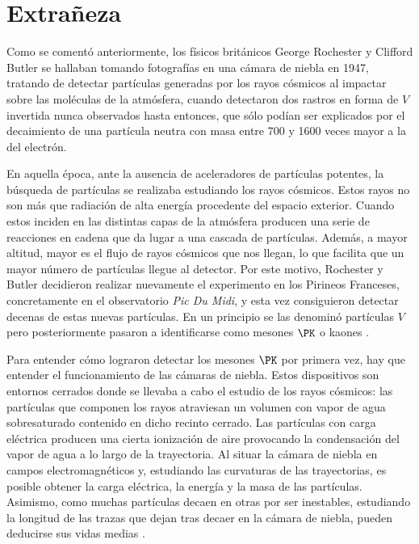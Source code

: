 \chapter{Extrañeza}\label{cap:strangeness}
Como se comentó anteriormente, los físicos británicos George Rochester y Clifford Butler se hallaban tomando fotografías en una cámara de niebla en 1947, tratando de detectar partículas generadas por los rayos cósmicos al impactar sobre las moléculas de la atmósfera, cuando detectaron dos rastros en forma de $V$ invertida nunca observados hasta entonces, que sólo podían ser explicados por el decaimiento de una partícula neutra con masa entre 700 y 1600 veces mayor a la del electrón. 

En aquella época, ante la ausencia de aceleradores de partículas potentes, la búsqueda de partículas se realizaba estudiando los rayos cósmicos. Estos rayos no son más que radiación de alta energía procedente del espacio exterior. Cuando estos inciden en las distintas capas de la atmósfera producen una serie de reacciones en cadena que da lugar a una cascada de partículas. Además, a mayor altitud, mayor es el flujo de rayos cósmicos que nos llegan, lo que facilita que un mayor número de partículas llegue al detector. Por este motivo, Rochester y Butler decidieron realizar nuevamente el experimento en los Pirineos Franceses, concretamente en el observatorio \textit{Pic Du Midi}, y esta vez consiguieron detectar decenas de estas nuevas partículas. En un principio se las denominó partículas $V$ pero posteriormente pasaron a identificarse como mesones $\PK$ o kaones \cite{Griffiths2008}.

Para entender cómo lograron detectar los mesones $\PK$ por primera vez, hay que entender el funcionamiento de las cámaras de niebla. Estos dispositivos son entornos cerrados donde se llevaba a cabo el estudio de los rayos cósmicos: las partículas que componen los rayos atraviesan un volumen con vapor de agua sobresaturado contenido en dicho recinto cerrado. Las partículas con carga eléctrica producen una cierta ionización de aire provocando la condensación del vapor de agua a lo largo de la trayectoria.  Al situar la cámara de niebla en campos electromagnéticos y, estudiando las curvaturas de las trayectorias, es posible obtener la carga eléctrica, la energía y la masa de las partículas.  Asimismo, como muchas partículas decaen en otras por ser inestables, estudiando la longitud de las trazas que dejan tras decaer en la cámara de niebla, pueden deducirse sus vidas medias \cite{notas2020}.

